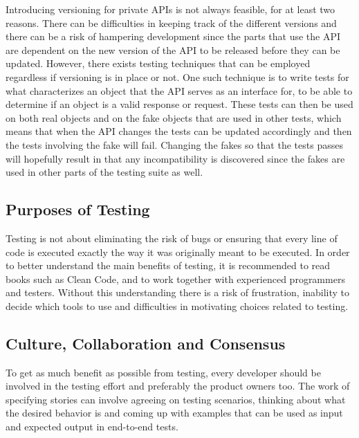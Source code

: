 \documentclass[11pt]{article}
\begin{document}
Introducing versioning for private APIs is not always feasible, for at least two reasons. There can be difficulties in keeping track of the different versions and there can be a risk of hampering development since the parts that use the API are dependent on the new version of the API to be released before they can be updated. However, there exists testing techniques that can be employed regardless if versioning is in place or not. One such technique is to write tests for what characterizes an object that the API serves as an interface for, to be able to determine if an object is a valid response or request. These tests can then be used on both real objects and on the fake objects that are used in other tests, which means that when the API changes the tests can be updated accordingly and then the tests involving the fake will fail. Changing the fakes so that the tests passes will hopefully result in that any incompatibility is discovered since the fakes are used in other parts of the testing suite as well. \cite[question~34]{Edelstam}

\subsection{Purposes of Testing}

Testing is not about eliminating the risk of bugs or ensuring that every line of code is executed exactly the way it was originally meant to be executed. In order to better understand the main benefits of testing, it is recommended to read books such as Clean Code, and to work together with experienced programmers and testers. Without this understanding there is a risk of frustration, inability to decide which tools to use and difficulties in motivating choices related to testing. \cite[question~38]{Edelstam}

\subsection{Culture, Collaboration and Consensus}

To get as much benefit as possible from testing, every developer should be involved in the testing effort and preferably the product owners too. The work of specifying stories can involve agreeing on testing scenarios, thinking about what the desired behavior is and coming up with examples that can be used as input and expected output in end-to-end tests. \cite[questions~39-40]{Edelstam}

\printbibliography[heading=bibnumbered]
\end{document}

